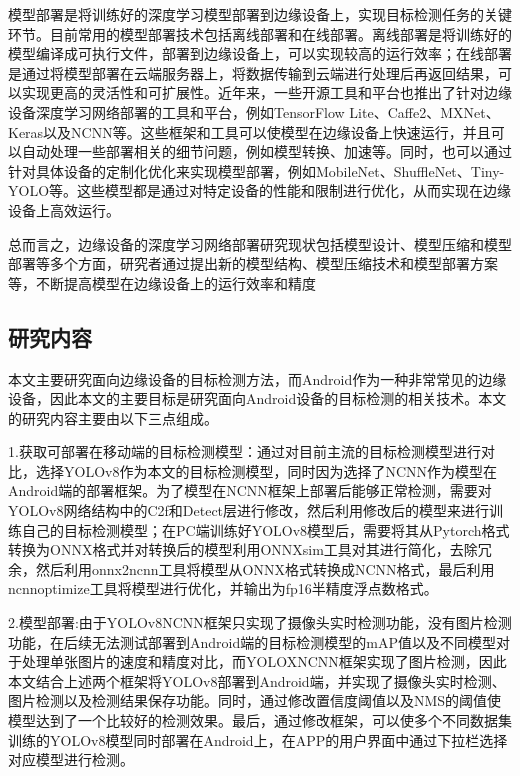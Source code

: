 \documentclass{ctexart}
\numberwithin{equation}{section}%
\numberwithin{figure}{section}%
\numberwithin{table}{section}%
\begin{document}
	模型部署是将训练好的深度学习模型部署到边缘设备上，实现目标检测任务的关键环节。目前常用的模型部署技术包括离线部署和在线部署。离线部署是将训练好的模型编译成可执行文件，部署到边缘设备上，可以实现较高的运行效率；在线部署是通过将模型部署在云端服务器上，将数据传输到云端进行处理后再返回结果，可以实现更高的灵活性和可扩展性。近年来，一些开源工具和平台也推出了针对边缘设备深度学习网络部署的工具和平台，例如TensorFlow Lite、Caffe2、MXNet、Keras以及NCNN\textsuperscript{\cite{15}}等。这些框架和工具可以使模型在边缘设备上快速运行，并且可以自动处理一些部署相关的细节问题，例如模型转换、加速等。同时，也可以通过针对具体设备的定制化优化来实现模型部署，例如MobileNet\textsuperscript{\cite{16}}、ShuffleNet\textsuperscript{\cite{17}}、Tiny-YOLO\textsuperscript{\cite{18}}等。这些模型都是通过对特定设备的性能和限制进行优化，从而实现在边缘设备上高效运行。
	
	总而言之，边缘设备的深度学习网络部署研究现状包括模型设计、模型压缩和模型部署等多个方面，研究者通过提出新的模型结构、模型压缩技术和模型部署方案等，不断提高模型在边缘设备上的运行效率和精度
	
	\subsection{研究内容}
	
	本文主要研究面向边缘设备的目标检测方法，而Android作为一种非常常见的边缘设备，因此本文的主要目标是研究面向Android设备的目标检测的相关技术。本文的研究内容主要由以下三点组成。
	
	1.获取可部署在移动端的目标检测模型：通过对目前主流的目标检测模型进行对比，选择YOLOv8作为本文的目标检测模型，同时因为选择了NCNN作为模型在Android端的部署框架。为了模型在NCNN框架上部署后能够正常检测，需要对YOLOv8网络结构中的C2f和Detect层进行修改，然后利用修改后的模型来进行训练自己的目标检测模型；在PC端训练好YOLOv8模型后，需要将其从Pytorch格式转换为ONNX格式并对转换后的模型利用ONNXsim工具对其进行简化，去除冗余，然后利用onnx2ncnn工具将模型从ONNX格式转换成NCNN格式，最后利用ncnnoptimize工具将模型进行优化，并输出为fp16半精度浮点数格式。
	
	2.模型部署:由于YOLOv8NCNN框架只实现了摄像头实时检测功能，没有图片检测功能，在后续无法测试部署到Android端的目标检测模型的mAP值以及不同模型对于处理单张图片的速度和精度对比，而YOLOXNCNN框架实现了图片检测，因此本文结合上述两个框架将YOLOv8部署到Android端，并实现了摄像头实时检测、图片检测以及检测结果保存功能。同时，通过修改置信度阈值以及NMS的阈值使模型达到了一个比较好的检测效果。最后，通过修改框架，可以使多个不同数据集训练的YOLOv8模型同时部署在Android上，在APP的用户界面中通过下拉栏选择对应模型进行检测。
	
\end{document}
